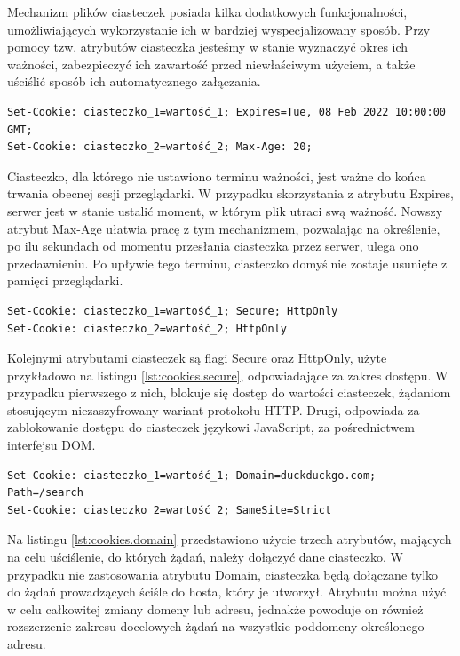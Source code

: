 Mechanizm plików ciasteczek posiada kilka dodatkowych funkcjonalności, umożliwiających wykorzystanie ich w bardziej wyspecjalizowany sposób. Przy pomocy tzw. atrybutów ciasteczka jesteśmy w stanie wyznaczyć okres ich ważności, zabezpieczyć ich zawartość przed niewłaściwym użyciem, a także uściślić sposób ich automatycznego załączania.

\begin{lstlisting}[caption=Przykładowe użycie atrybutu terminu ważności ciasteczka HTTP, label=lst:cookies.expires]
Set-Cookie: ciasteczko_1=wartość_1; Expires=Tue, 08 Feb 2022 10:00:00 GMT;
Set-Cookie: ciasteczko_2=wartość_2; Max-Age: 20;
\end{lstlisting}

Ciasteczko, dla którego nie ustawiono terminu ważności, jest ważne do końca trwania obecnej sesji przeglądarki. W przypadku skorzystania z atrybutu Expires, serwer jest w stanie ustalić moment, w którym plik utraci swą ważność. Nowszy atrybut Max-Age ułatwia pracę z tym mechanizmem, pozwalając na określenie, po ilu sekundach od momentu przesłania ciasteczka przez serwer, ulega ono przedawnieniu. Po upływie tego terminu, ciasteczko domyślnie zostaje usunięte z pamięci przeglądarki.

\begin{lstlisting}[caption=Przykładowe użycie atrybutów dostępu ciasteczka HTTP, label=lst:cookies.secure]
Set-Cookie: ciasteczko_1=wartość_1; Secure; HttpOnly
Set-Cookie: ciasteczko_2=wartość_2; HttpOnly
\end{lstlisting}

Kolejnymi atrybutami ciasteczek są flagi Secure oraz HttpOnly, użyte przykładowo na listingu \ref{lst:cookies.secure}, odpowiadające za zakres dostępu. W przypadku pierwszego z nich, blokuje się dostęp do wartości ciasteczek, żądaniom stosującym niezaszyfrowany wariant protokołu HTTP. Drugi, odpowiada za zablokowanie dostępu do ciasteczek językowi JavaScript, za pośrednictwem interfejsu DOM.

\begin{lstlisting}[caption=Przykładowe użycie atrybutów punktu docelowego ciasteczka HTTP, label=lst:cookies.domain]
Set-Cookie: ciasteczko_1=wartość_1; Domain=duckduckgo.com; Path=/search
Set-Cookie: ciasteczko_2=wartość_2; SameSite=Strict
\end{lstlisting}

Na listingu \ref{lst:cookies.domain} przedstawiono użycie trzech atrybutów, mających na celu uściślenie, do których żądań, należy dołączyć dane ciasteczko. W przypadku nie zastosowania atrybutu Domain, ciasteczka będą dołączane tylko do żądań prowadzących ściśle do hosta, który je utworzył. Atrybutu można użyć w celu całkowitej zmiany domeny lub adresu, jednakże powoduje on również rozszerzenie zakresu docelowych żądań na wszystkie poddomeny określonego adresu.


